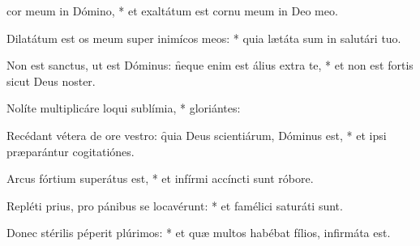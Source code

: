 \begin{psalmus}

 cor meum in Dómino, * et exaltátum est cornu meum in Deo meo.

Dilatátum est os meum super inimícos meos: * quia lætáta sum in salutári tuo.

Non est sanctus, ut est Dóminus: \f neque enim est álius extra te, * et non est fortis sicut Deus noster.

Nolíte multiplicáre loqui sublímia, * gloriántes:

Recédant vétera de ore vestro: \f quia Deus scientiárum, Dóminus est, * et ipsi præparántur cogitatiónes.

Arcus fórtium superátus est, * et infírmi accíncti sunt róbore.

Repléti prius, pro pánibus se locavérunt: * et famélici saturáti sunt.

Donec stérilis péperit plúrimos: * et quæ multos habébat fílios, infirmáta est.

\end{psalmus}
